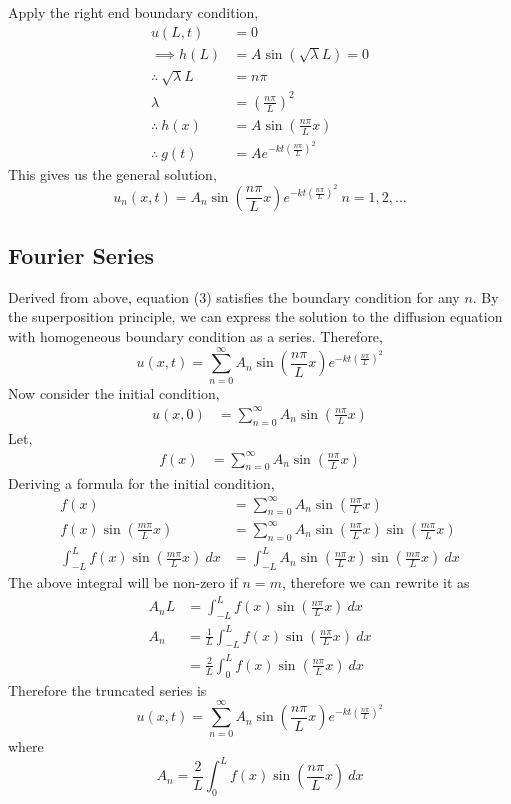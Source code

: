 \documentclass{article}
\begin{document}
Apply the right end boundary condition,
\[
	\begin{split}
		u(L, t) &= 0 \\
		\implies h(L) &= A\sin{(\sqrt{\lambda}L)} = 0 \\
		\therefore \ \sqrt{\lambda}L &= n\pi \\
		\lambda &= \left(\frac{n\pi}{L}\right)^2 \\
		\therefore \ h(x) &= A\sin{\left(\frac{n\pi}{L}x\right)} \\
		\therefore \ g(t) &= Ae^{-kt\left(\frac{n\pi}{L}\right)^2}
	\end{split}
\]
This gives us the general solution,
\begin{equation}
\label{eq:c}
u_n(x,t)=A_n\sin{\left(\frac{n\pi}{L}x\right)}e^{-kt\left(\frac{n\pi}{L}\right)^2} \ n=1,2,...
\end{equation}
\subsection{Fourier Series}
Derived from above, equation (3) satisfies the boundary condition for any $n$. By the superposition principle, we can express the solution to the diffusion equation with homogeneous boundary condition as a series. Therefore, 
\begin{equation}
\label{eq:d}
	u(x,t) = \sum^{\infty}_{n=0} A_n\sin{\left(\frac{n\pi}{L}x\right)}e^{-kt\left(\frac{n\pi}{L}\right)^2}
\end{equation}
Now consider the initial condition,
\[
	\begin{split}
		u(x,0) &= \sum^{\infty}_{n=0} A_n\sin{\left(\frac{n\pi}{L}x\right)}
	\end{split}
\]
Let,
\[
	\begin{split}
		f(x) &= \sum^{\infty}_{n=0} A_n\sin{\left(\frac{n\pi}{L}x\right)}
	\end{split}
\]
Deriving a formula for the initial condition,
\[
	\begin{split}
		f(x) &= \sum^{\infty}_{n=0} A_n\sin{\left(\frac{n\pi}{L}x\right)} \\
		f(x)\sin{\left(\frac{m\pi}{L}x\right)} &= \sum^{\infty}_{n=0} A_n\sin{\left(\frac{n\pi}{L}x\right)}\sin{\left(\frac{m\pi}{L}x\right)} \\
		\int_{-L}^{L} f(x)\sin{\left(\frac{m\pi}{L}x\right)} \ dx & = \int_{-L}^{L} A_n\sin{\left(\frac{n\pi}{L}x\right)}\sin{\left(\frac{m\pi}{L}x\right)} \ dx
	\end{split}
\]
The above integral will be non-zero if $n=m$, therefore we can rewrite it as
\[
	\begin{split}
		A_nL &= \int_{-L}^{L} f(x)\sin{\left(\frac{n\pi}{L}x\right)} \ dx  \\
		A_n &= \frac{1}{L} \int_{-L}^{L} f(x)\sin{\left(\frac{n\pi}{L}x\right)} \ dx\\
		&=\frac{2}{L} \int_{0}^{L} f(x)\sin{\left(\frac{n\pi}{L}x\right)} \ dx
	\end{split}
\]
Therefore the truncated series is
\[
	u(x,t) = \sum^{\infty}_{n=0} A_n\sin{\left(\frac{n\pi}{L}x\right)}e^{-kt\left(\frac{n\pi}{L}\right)^2}
\]
where
\[
	A_n = \frac{2}{L} \int_{0}^{L} f(x)\sin{\left(\frac{n\pi}{L}x\right)} \ dx
\]
\end{document}
